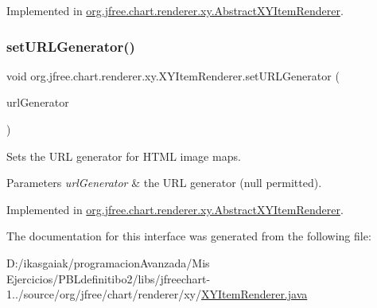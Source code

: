 Implemented in \mbox{\hyperlink{classorg_1_1jfree_1_1chart_1_1renderer_1_1xy_1_1_abstract_x_y_item_renderer_afa8b73dbc8a04e692a889daac0a5327e}{org.\+jfree.\+chart.\+renderer.\+xy.\+Abstract\+X\+Y\+Item\+Renderer}}.

\mbox{\label{interfaceorg_1_1jfree_1_1chart_1_1renderer_1_1xy_1_1_x_y_item_renderer_af97976534963161b4cc9bb0615ad3cfc}} 
\subsubsection{\texorpdfstring{set\+U\+R\+L\+Generator()}{setURLGenerator()}}
{\footnotesize\ttfamily void org.\+jfree.\+chart.\+renderer.\+xy.\+X\+Y\+Item\+Renderer.\+set\+U\+R\+L\+Generator (\begin{DoxyParamCaption}\item[{\mbox{\hyperlink{interfaceorg_1_1jfree_1_1chart_1_1urls_1_1_x_y_u_r_l_generator}{X\+Y\+U\+R\+L\+Generator}}}]{url\+Generator }\end{DoxyParamCaption})}

Sets the U\+RL generator for H\+T\+ML image maps.


\begin{DoxyParams}{Parameters}
{\em url\+Generator} & the U\+RL generator (null permitted). \\
\hline
\end{DoxyParams}


Implemented in \mbox{\hyperlink{classorg_1_1jfree_1_1chart_1_1renderer_1_1xy_1_1_abstract_x_y_item_renderer_a892f5defad1225851e527b40b7913907}{org.\+jfree.\+chart.\+renderer.\+xy.\+Abstract\+X\+Y\+Item\+Renderer}}.



The documentation for this interface was generated from the following file\+:\begin{DoxyCompactItemize}
\item 
D\+:/ikasgaiak/programacion\+Avanzada/\+Mis Ejercicios/\+P\+B\+Ldefinitibo2/libs/jfreechart-\/1../source/org/jfree/chart/renderer/xy/\mbox{\hyperlink{_x_y_item_renderer_8java}{X\+Y\+Item\+Renderer.\+java}}\end{DoxyCompactItemize}
